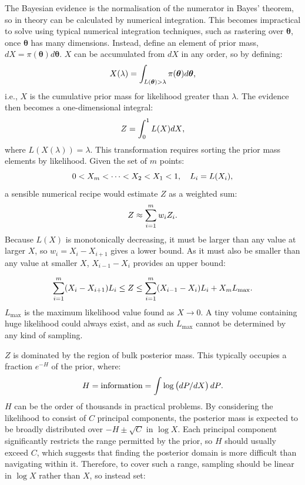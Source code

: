 \documentclass{article}
\begin{document}
The Bayesian evidence is the normalisation of the numerator in Bayes' theorem, so in theory can be calculated by numerical integration. This becomes impractical to solve using typical numerical integration techniques, such as rastering over $\bm\theta$, once $\bm\theta$ has many dimensions. Instead, define an element of prior mass, $dX = \pi(\bm\theta)d\bm\theta$. $X$ can be accumulated from $dX$ in any order, so by defining:
%
\begin{equation}
  X(\lambda) = \int_{L(\bm\theta)>\lambda} \pi(\bm\theta)d\bm\theta\textrm,
\end{equation}
%
i.e., $X$ is the cumulative prior mass for likelihood greater than $\lambda$. The evidence then becomes a one-dimensional integral:
%
\begin{equation}
  Z = \int_0^1 L(X) dX\textrm,
\end{equation}
%
where $L(X(\lambda)) = \lambda$. This transformation requires sorting the prior mass elements by likelihood. Given the set of $m$ points:
\begin{equation}
  0<X_m<\dots<X_2<X_1<1, \quad L_i = L(X_i)\textrm,
\end{equation}
%
a sensible numerical recipe would estimate $Z$ as a weighted sum:
%
\begin{equation}
  Z \approx \sum_{i=1}^m w_i Z_i\textrm.
\end{equation}
%
Because $L(X)$ is monotonically decreasing, it must be larger than any value at larger $X$, so $w_i=X_i-X_{i+1}$ gives a lower bound. As it must also be smaller than any value at smaller $X$, $X_{i-1}-X_i$ provides an upper bound:

\begin{equation}
  \sum_{i=1}^m (X_i-X_{i+1})L_i \le Z \le \sum_{i=1}^m (X_{i-1}-X_i)L_i + X_mL_\textrm{max}\textrm.
\end{equation}
%
$L_\textrm{max}$ is the maximum likelihood value found as $X\to0$. A tiny volume containing huge likelihood could always exist, and as such $L_\textrm{max}$ cannot be determined by any kind of sampling.
 
$Z$ is dominated by the region of bulk posterior mass. This typically occupies a fraction $e^{-H}$ of the prior, where:
%
\begin{equation}
  H = \textrm{information} = \int \log\left(dP/dX\right)dP\textrm.
\end{equation}
%
$H$ can be the order of thousands in practical problems. By considering the likelihood to consist of $C$ principal components, the posterior mass is expected to be broadly distributed over $-H\pm\sqrt{C}$ in $\log X$. Each principal component significantly restricts the range permitted by the prior, so $H$ should usually exceed $C$, which suggests that finding the posterior domain is more difficult than navigating within it. Therefore, to cover such a range, sampling should be linear in $\log X$ rather than $X$, so instead set:
\end{document}
